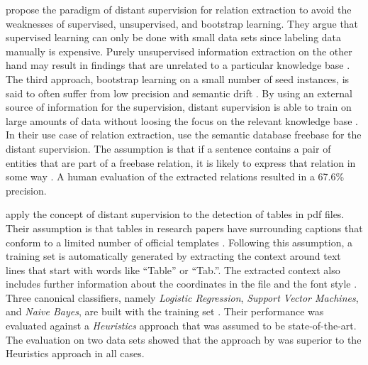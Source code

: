 \citet{mintz2009distant} propose the paradigm of \gls{distant supervision} for relation extraction to avoid the weaknesses of supervised, unsupervised, and bootstrap learning.
They argue that supervised learning can only be done with small data sets since labeling data manually is expensive.
Purely unsupervised information extraction on the other hand may result in findings that are unrelated to a particular knowledge base \citep{mintz2009distant}.
The third approach, bootstrap learning on a small number of seed instances, is said to often suffer from low precision and semantic drift \citep{mintz2009distant}.
By using an external source of information for the supervision, \gls{distant supervision} is able to train on large amounts of data without loosing the focus on the relevant knowledge base \citep{mintz2009distant}.
In their use case of relation extraction, \citet{mintz2009distant} use the semantic database \gls{freebase} \citep{bollacker2008freebase} for the \gls{distant supervision}.
The assumption is that if a sentence contains a pair of entities that are part of a \gls{freebase} relation, it is likely to express that relation in some way \citep{mintz2009distant}.
A human evaluation of the extracted relations resulted in a 67.6\% precision.

\citet{fan2015detecting} apply the concept of \gls{distant supervision} to the detection of tables in \gls{pdf} files. Their assumption is that tables in research papers have surrounding captions that conform to a limited number of official templates \citep{fan2015detecting}. Following this assumption, a training set is automatically generated by extracting the context around text lines that start with words like ``Table'' or ``Tab.''. The extracted context also includes further information about the coordinates in the file and the font style \citep{fan2015detecting}. Three canonical classifiers, namely \emph{Logistic Regression}, \emph{Support Vector Machines}, and \emph{Naive Bayes}, are built with the training set \citep{fan2015detecting}. Their performance was evaluated against a \emph{Heuristics} approach \citep{klampfl2014comparison} that was assumed to be state-of-the-art. The evaluation on two data sets showed that the approach by \citet{fan2015detecting} was superior to the Heuristics approach in all cases.\\

